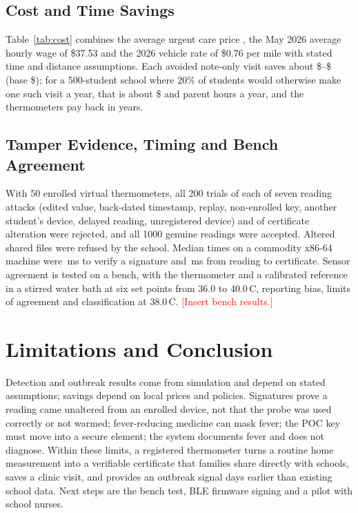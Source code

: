 \documentclass[journal]{IEEEtran}
\newcommand{\tbd}[1]{\textcolor{red}{[#1]}}
\begin{document}
\subsection{Cost and Time Savings}
Table~\ref{tab:cost} combines the average urgent care price \cite{hcci2026}, the May 2026 average hourly wage of \$37.53 \cite{bls2026} and the 2026 vehicle rate of \$0.76 per mile \cite{irs2026} with stated time and distance assumptions. Each avoided note-only visit saves about \$\CostVisitLow--\$\CostVisitHigh{} (base \$\CostVisitBase); for a 500-student school where 20\% of students would otherwise make one such visit a year, that is about \$\CostSchoolBase{} and \HoursSchoolBase{} parent hours a year, and the thermometers pay back in \PaybackBase{} years.



\subsection{Tamper Evidence, Timing and Bench Agreement}
With 50 enrolled virtual thermometers, all 200 trials of each of seven reading attacks (edited value, back-dated timestamp, replay, non-enrolled key, another student's device, delayed reading, unregistered device) and of certificate alteration were rejected, and all 1000 genuine readings were accepted. Altered shared files were refused by the school. Median times on a commodity x86-64 machine were \VerifyMs{}\,ms to verify a signature and \EtoEMs{}\,ms from reading to certificate. Sensor agreement is tested on a bench, with the thermometer and a calibrated reference in a stirred water bath at six set points from 36.0 to 40.0\,\textdegree C, reporting bias, limits of agreement and classification at 38.0\,\textdegree C. \tbd{Insert bench results.}

\section{Limitations and Conclusion}
Detection and outbreak results come from simulation and depend on stated assumptions; savings depend on local prices and policies. Signatures prove a reading came unaltered from an enrolled device, not that the probe was used correctly or not warmed; fever-reducing medicine can mask fever; the POC key must move into a secure element; the system documents fever and does not diagnose. Within these limits, a registered thermometer turns a routine home measurement into a verifiable certificate that families share directly with schools, saves a clinic visit, and provides an outbreak signal days earlier than existing school data. Next steps are the bench test, BLE firmware signing and a pilot with school nurses.
\end{document}

